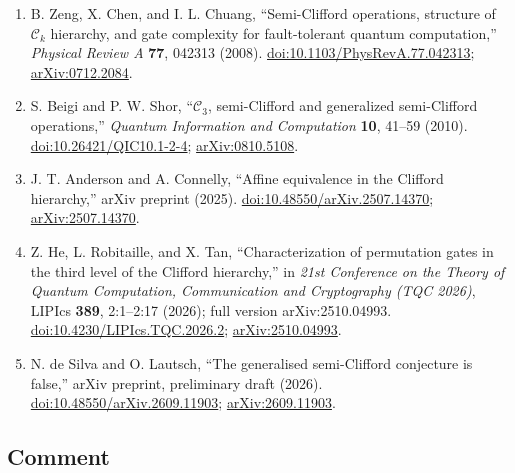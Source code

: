\begin{enumerate}[label={},leftmargin=4.8em,labelsep=0.5em]
  \footnotesize
  \item[\textup{[ZCC08]}]\label{ref:5a17-zcc08}
  B. Zeng, X. Chen, and I. L. Chuang, ``Semi-Clifford operations, structure of
  $\mathcal{C}_k$ hierarchy, and gate complexity for fault-tolerant quantum
  computation,'' \emph{Physical Review A} \textbf{77}, 042313 (2008).
  \href{https://doi.org/10.1103/PhysRevA.77.042313}{doi:10.1103/PhysRevA.77.042313};
  \href{https://arxiv.org/abs/0712.2084}{arXiv:0712.2084}.

  \item[\textup{[BS10]}]\label{ref:5a17-bs10}
  S. Beigi and P. W. Shor, ``$\mathcal{C}_3$, semi-Clifford and generalized
  semi-Clifford operations,'' \emph{Quantum Information and Computation}
  \textbf{10}, 41--59 (2010).
  \href{https://doi.org/10.26421/QIC10.1-2-4}{doi:10.26421/QIC10.1-2-4};
  \href{https://arxiv.org/abs/0810.5108}{arXiv:0810.5108}.

  \item[\textup{[AC25]}]\label{ref:5a17-ac25}
  J. T. Anderson and A. Connelly, ``Affine equivalence in the Clifford
  hierarchy,'' arXiv preprint (2025).
  \href{https://doi.org/10.48550/arXiv.2507.14370}{doi:10.48550/arXiv.2507.14370};
  \href{https://arxiv.org/abs/2507.14370}{arXiv:2507.14370}.

  \item[\textup{[HRT26]}]\label{ref:5a17-hrt26}
  Z. He, L. Robitaille, and X. Tan, ``Characterization of permutation gates in
  the third level of the Clifford hierarchy,'' in \emph{21st Conference on the
  Theory of Quantum Computation, Communication and Cryptography (TQC 2026)},
  LIPIcs \textbf{389}, 2:1--2:17 (2026); full version arXiv:2510.04993.
  \href{https://doi.org/10.4230/LIPIcs.TQC.2026.2}{doi:10.4230/LIPIcs.TQC.2026.2};
  \href{https://arxiv.org/abs/2510.04993}{arXiv:2510.04993}.

  \item[\textup{[dSL26]}]\label{ref:5a17-dsl26}
  N. de Silva and O. Lautsch, ``The generalised semi-Clifford conjecture is
  false,'' arXiv preprint, preliminary draft (2026).
  \href{https://doi.org/10.48550/arXiv.2609.11903}{doi:10.48550/arXiv.2609.11903};
  \href{https://arxiv.org/abs/2609.11903}{arXiv:2609.11903}.
\end{enumerate}

\subsection*{Comment}

